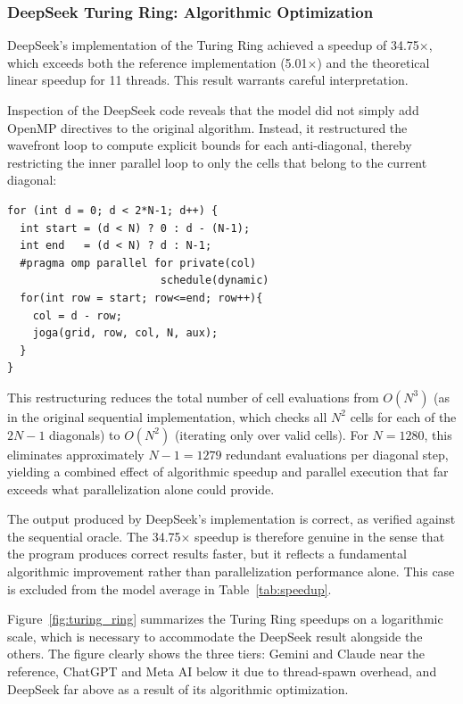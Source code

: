 \documentclass[conference]{IEEEtran}
\begin{document}
\subsubsection{DeepSeek Turing Ring: Algorithmic Optimization} \label{subsec:deepseek_tr}

DeepSeek's implementation of the Turing Ring achieved a speedup of 34.75$\times$, which exceeds both the reference implementation (5.01$\times$) and the theoretical linear speedup for 11 threads. This result warrants careful interpretation.

Inspection of the DeepSeek code reveals that the model did not simply add OpenMP directives to the original algorithm. Instead, it restructured the wavefront loop to compute explicit bounds for each anti-diagonal, thereby restricting the inner parallel loop to only the cells that belong to the current diagonal:

\begin{verbatim}
for (int d = 0; d < 2*N-1; d++) {
  int start = (d < N) ? 0 : d - (N-1);
  int end   = (d < N) ? d : N-1;
  #pragma omp parallel for private(col) 
                        schedule(dynamic)
  for(int row = start; row<=end; row++){
    col = d - row;
    joga(grid, row, col, N, aux);
  }
}
\end{verbatim}

This restructuring reduces the total number of cell evaluations from $O(N^3)$ (as in the original sequential implementation, which checks all $N^2$ cells for each of the $2N-1$ diagonals) to $O(N^2)$ (iterating only over valid cells). For $N=1280$, this eliminates approximately $N-1 = 1279$ redundant evaluations per diagonal step, yielding a combined effect of algorithmic speedup and parallel execution that far exceeds what parallelization alone could provide.

The output produced by DeepSeek's implementation is correct, as verified against the sequential oracle. The 34.75$\times$ speedup is therefore genuine in the sense that the program produces correct results faster, but it reflects a fundamental algorithmic improvement rather than parallelization performance alone. This case is excluded from the model average in Table~\ref{tab:speedup}.

Figure~\ref{fig:turing_ring} summarizes the Turing Ring speedups on a logarithmic scale, which is necessary to accommodate the DeepSeek result alongside the others. The figure clearly shows the three tiers: Gemini and Claude near the reference, ChatGPT and Meta AI below it due to thread-spawn overhead, and DeepSeek far above as a result of its algorithmic optimization.
\end{document}
